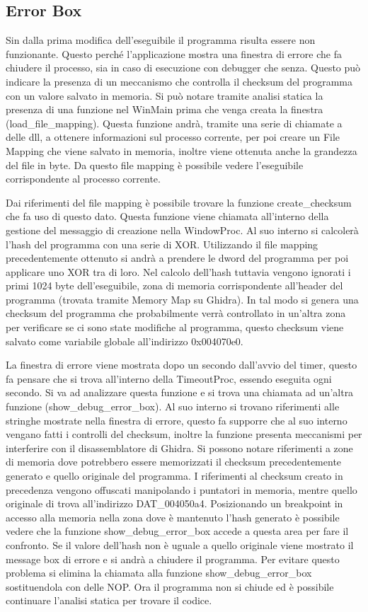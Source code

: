 \documentclass[a4paper,12pt]{article}
\begin{document}
\subsection{Error Box}
Sin dalla prima modifica dell'eseguibile il programma risulta essere non funzionante. Questo perché l'applicazione mostra una finestra di errore che fa chiudere il processo, sia in caso di esecuzione con debugger che senza.  Questo può indicare la presenza di un meccanismo che controlla il checksum del programma con un valore salvato in memoria. Si può notare tramite analisi statica la presenza di una funzione nel WinMain prima che venga creata la finestra (load\_file\_mapping). Questa funzione andrà, tramite una serie di chiamate a delle dll, a ottenere informazioni sul processo corrente, per poi creare un File Mapping che viene salvato in memoria, inoltre viene ottenuta anche la grandezza del file in byte. Da questo file mapping è possibile vedere l'eseguibile corrispondente al processo corrente.

Dai riferimenti del file mapping è possibile trovare la funzione create\_checksum che fa uso di questo dato. Questa funzione viene chiamata all'interno della gestione del messaggio di creazione nella WindowProc. 
Al suo interno si calcolerà l'hash del programma con una serie di XOR. Utilizzando il file mapping precedentemente ottenuto si andrà a prendere le dword del programma per poi applicare uno XOR tra di loro.  Nel calcolo dell'hash tuttavia vengono ignorati i primi 1024 byte dell'eseguibile, zona di memoria corrispondente all'header del programma (trovata tramite Memory Map su Ghidra).
In tal modo si genera una checksum del programma che probabilmente verrà controllato in un'altra zona per verificare se ci sono state modifiche al programma, questo checksum viene salvato come variabile globale all'indirizzo 0x004070e0.  

La finestra di errore viene mostrata dopo un secondo dall'avvio del timer, questo fa pensare che si trova all'interno della TimeoutProc, essendo eseguita ogni secondo. Si va ad analizzare questa funzione e si trova una chiamata ad un'altra funzione (show\_debug\_error\_box). Al suo interno si trovano riferimenti alle stringhe mostrate nella finestra di errore, questo fa supporre che al suo interno vengano fatti i controlli del checksum, inoltre la funzione presenta meccanismi per interferire con il disassemblatore di Ghidra. 
Si possono notare riferimenti a zone di memoria dove potrebbero essere memorizzati il checksum precedentemente generato e quello originale del programma. I riferimenti al checksum creato in precedenza vengono offuscati manipolando i puntatori in memoria, mentre quello originale di trova all'indirizzo DAT\_004050a4. Posizionando un breakpoint in accesso alla memoria nella zona dove è mantenuto l'hash generato è possibile vedere che la funzione show\_debug\_error\_box accede a questa area per fare il confronto. Se il valore dell'hash non è uguale a quello originale viene mostrato il message box di errore e si andrà a chiudere il programma. Per evitare questo problema si elimina la chiamata alla funzione show\_debug\_error\_box sostituendola con delle NOP. Ora il programma non si chiude ed è possibile continuare l'analisi statica per trovare il codice.
\end{document}
